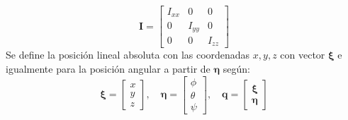 \documentclass[twoside]{article}
\begin{document}
\begin{equation}\textbf{I}=\left[ \begin{array}{ccc}
I_{xx} & 0 & 0 \\
0 & I_{yy} & 0 \\
0 & 0 & I_{zz} 
\end{array} \right] \end{equation}
Se define la posición lineal absoluta con las coordenadas $x,y,z$ con vector $\pmb{\xi}$ e igualmente para la posición angular a partir de $\pmb{\eta}$ según:
\begin{equation} 
\pmb{\xi}=\left[ \begin{array}{ccc}
x\\
y\\
z \end{array} \right] ,\quad \pmb{\eta}=\left[ \begin{array}{ccc}
\phi\\
\theta\\
\psi \end{array} \right] , \quad \pmb{q}=\left[\begin{array}{c}
\pmb{\xi}\\
\pmb{\eta} \end{array} \right] 
\end{equation}
\end{document}
